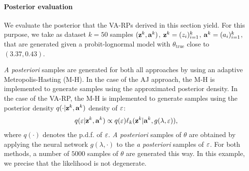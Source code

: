 
\paragraph{Posterior evaluation}
We evaluate the posterior that the VA-RPs derived in this section yield.
For this purpose, we take as dataset $k=50$ samples $(\mathbf{z}^k,\mathbf{a}^k)$, $\mathbf{z}^k=(z_i)_{i=1}^k$, $\mathbf{a}^k=(a_i)_{i=1}^k$, that are generated given a probit-lognormal model with $\theta_{\text{true}}$ close to $(3.37, 0.43)$. %

\emph{A posteriori} samples are generated for both all approaches by using an adaptive Metropolis-Hasting (M-H).
In the case of the AJ approach, the M-H is implemented to generate samples using the approximated posterior density.
In the case of the VA-RP, the M-H is implemented to generate samples using the posterior density $q(\cdot|\mathbf{z}^k,\mathbf{a}^k)$ density of $\varepsilon$:
    \begin{equation}
        q(\varepsilon|\mathbf{z}^k,\mathbf{a}^k) \propto q(\varepsilon)\ell_k(\mathbf{z}^k|\mathbf{a}^k,g(\lambda,\varepsilon)),
    \end{equation}
where $q(\cdot)$ denotes the p.d.f. of $\varepsilon$.
\emph{A posteriori} samples of $\theta$ are obtained by applying the neural network $g(\lambda,\cdot)$ to the \emph{a posteriori} samples of $\varepsilon$.
For both methods, a number of $5000$ samples of $\theta$ are generated this way.
In this example, 
we precise that the likelihood is not degenerate.





